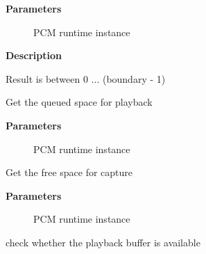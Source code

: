 \documentclass[a4paper,8pt,english]{sphinxmanual}
\begin{document}
\textbf{Parameters}
\begin{description}
\item[{}] \leavevmode
PCM runtime instance

\end{description}

\textbf{Description}

Result is between 0 ... (boundary - 1)

\begin{fulllineitems}
\label{sound/kernel-api/alsa-driver-api:c.snd_pcm_playback_hw_avail}
Get the queued space for playback

\end{fulllineitems}


\textbf{Parameters}
\begin{description}
\item[{}] \leavevmode
PCM runtime instance

\end{description}

\begin{fulllineitems}
\label{sound/kernel-api/alsa-driver-api:c.snd_pcm_capture_hw_avail}
Get the free space for capture

\end{fulllineitems}


\textbf{Parameters}
\begin{description}
\item[{}] \leavevmode
PCM runtime instance

\end{description}

\begin{fulllineitems}
\label{sound/kernel-api/alsa-driver-api:c.snd_pcm_playback_ready}
check whether the playback buffer is available

\end{fulllineitems}
\end{document}
